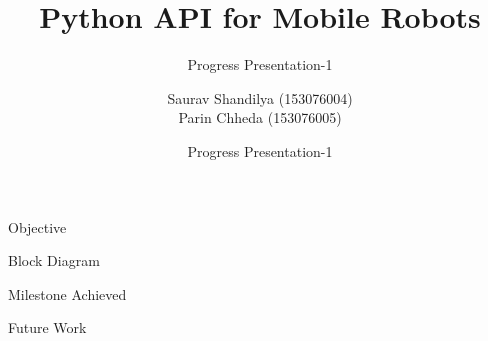 \documentclass[10pt,handout,english]{beamer}
\title[] %
{Python API for Mobile Robots}
\subtitle{Progress Presentation-1}
\author[Author, Anders] %
{Saurav Shandilya (153076004) \\ Parin Chheda (153076005)}
\institute %
{
  Indian Institute of Technology Bombay
}
\date[\today] %
{Progress Presentation-1}
\begin{document}
\frame{\titlepage}

\begin{frame}{Objective}

\end{frame}

\begin{frame}{Block Diagram}

\end{frame}

\begin{frame}{Milestone Achieved}

\end{frame}

\begin{frame}{Future Work}

\end{frame}
\end{document}
